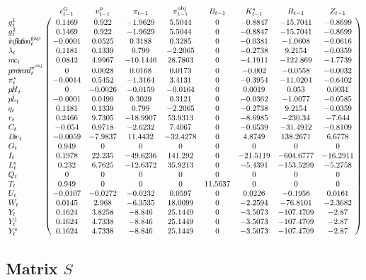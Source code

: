 $$\bordermatrix{
~ & \epsilon^{\mathrm{G}}_{t-1} & \nu^{\mathrm{p}}_{t-1} & \pi_{t-1} & \pi^{\mathrm{obj}}_{t-1} & B_{t-1} & K^{\mathrm{s}}_{t-1} & R_{t-1} & Z_{t-1} \cr
g^{\mathrm{1}}_{t} & 0.1469 & 0.922 & -1.9629 & 5.5044 & 0 & -0.8847 & -15.7041 & -0.8699 \cr
g^{\mathrm{2}}_{t} & 0.1469 & 0.922 & -1.9629 & 5.5044 & 0 & -0.8847 & -15.7041 & -0.8699 \cr
{i\!n\!f\!l\!a\!t\!i\!o\!n}^{\mathrm{gap}}_{t} & -0.0001 & 0.0525 & 0.3188 & 0.3285 & 0 & -0.0381 & -1.0608 & -0.0616 \cr
\lambda_{t} & 0.1181 & 0.1339 & 0.799 & -2.2065 & 0 & -0.2738 & 9.2154 & -0.0359 \cr
{m\!c}_{t} & 0.0842 & 4.9967 & -10.1446 & 28.7863 & 0 & -4.1911 & -122.869 & -4.7739 \cr
{p\!e\!r\!c\!i\!e\!v\!e\!d}^{\pi^{\mathrm{obj}}}_{t} & 0 & 0.0028 & 0.0168 & 0.0173 & 0 & -0.002 & -0.0558 & -0.0032 \cr
\pi^{\star}_{t} & -0.0014 & 0.5452 & -1.3164 & 3.4131 & 0 & -0.3954 & -11.0204 & -0.6402 \cr
{p\!H}_{t} & 0 & -0.0026 & -0.0159 & -0.0164 & 0 & 0.0019 & 0.053 & 0.0031 \cr
{p\!L}_{t} & -0.0001 & 0.0499 & 0.3029 & 0.3121 & 0 & -0.0362 & -1.0077 & -0.0585 \cr
q_{t} & 0.1181 & 0.1339 & 0.799 & -2.2065 & 0 & -0.2738 & 9.2154 & -0.0359 \cr
r_{t} & 0.2466 & 9.7305 & -18.9907 & 53.9313 & 0 & -8.6985 & -230.34 & -7.644 \cr
C_{t} & -0.054 & 0.9718 & -2.6232 & 7.4067 & 0 & -0.6539 & -31.4912 & -0.8109 \cr
{D\!i\!v}_{t} & -0.0059 & -7.9837 & 11.4432 & -32.4278 & 0 & 4.8749 & 138.2671 & 6.6778 \cr
G_{t} & 0.949 & 0 & 0 & 0 & 0 & 0 & 0 & 0 \cr
I_{t} & 0.1978 & 22.235 & -49.6236 & 141.292 & 0 & -21.5119 & -604.6777 & -16.2911 \cr
L^{\mathrm{s}}_{t} & 0.232 & 6.7625 & -12.6372 & 35.9213 & 0 & -5.4391 & -153.5299 & -5.2758 \cr
Q_{t} & 0 & 0 & 0 & 0 & 0 & 0 & 0 & 0 \cr
T_{t} & 0.949 & 0 & 0 & 0 & 11.5637 & 0 & 0 & 0 \cr
U_{t} & -0.0107 & -0.0272 & -0.0232 & 0.0597 & 0 & 0.0226 & -0.1956 & 0.0161 \cr
W_{t} & 0.0145 & 2.968 & -6.3535 & 18.0099 & 0 & -2.2594 & -76.8101 & -2.3682 \cr
Y_{t} & 0.1624 & 3.8258 & -8.846 & 25.1449 & 0 & -3.5073 & -107.4709 & -2.87 \cr
Y^{\mathrm{j}}_{t} & 0.1624 & 4.7338 & -8.846 & 25.1449 & 0 & -3.5073 & -107.4709 & -2.87 \cr
Y^{\mathrm{s}}_{t} & 0.1624 & 4.7338 & -8.846 & 25.1449 & 0 & -3.5073 & -107.4709 & -2.87 \cr
}$$

\subsection*{Matrix $S$}

